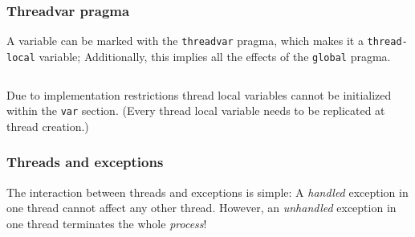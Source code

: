 \hypertarget{threadvar-pragma}{%
\subsubsection{Threadvar pragma}\label{threadvar-pragma}}

A variable can be marked with the \texttt{threadvar} pragma, which makes
it a \texttt{thread-local} variable; Additionally, this implies all the
effects of the \texttt{global} pragma.

\begin{verbatim}
\end{verbatim}

Due to implementation restrictions thread local variables cannot be
initialized within the \texttt{var} section. (Every thread local
variable needs to be replicated at thread creation.)

\hypertarget{threads-and-exceptions}{%
\subsubsection{Threads and exceptions}\label{threads-and-exceptions}}

The interaction between threads and exceptions is simple: A
\emph{handled} exception in one thread cannot affect any other thread.
However, an \emph{unhandled} exception in one thread terminates the
whole \emph{process}!
